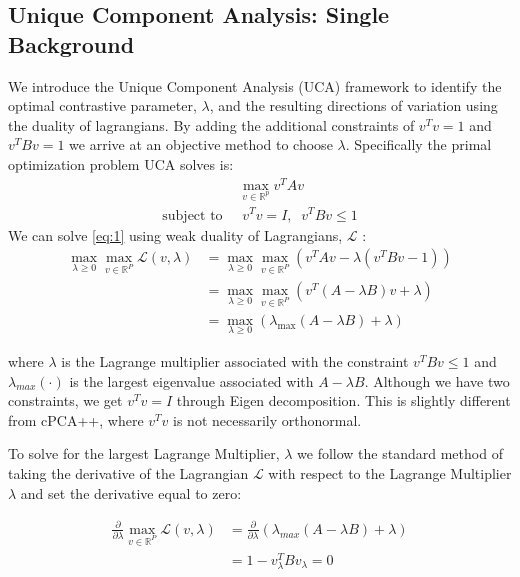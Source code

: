 \documentclass[12pt]{article}
\begin{document}
\subsection{Unique Component Analysis: Single Background}
 We introduce the Unique Component Analysis (UCA) framework to identify the optimal contrastive parameter, $\lambda$, and the resulting directions of variation using the duality of lagrangians.
 By adding the additional constraints of $v^T v = 1$ and $v^T Bv = 1$ we arrive at an objective method to choose $\lambda$. Specifically the primal optimization problem UCA solves is:
     \begin{align}
         &\max_{v\in \mathbb{R}^p}{v^TAv} \label{eq:1} \\ \text{subject to }&\; v^{T}v=I,\;\; v^TBv \leq 1 \nonumber
     \end{align}
    We can solve \ref{eq:1} using weak duality of Lagrangians, $\mathcal{L}$ :
     \begin{align}
         \max_{\lambda \geq 0}{\max_{v\in \mathbb{R}^{P}}{\mathcal{L}}}\left(v,\lambda\right) &= \max_{\lambda \geq 0}{\max_{v\in \mathbb{R}^{P}}{\left( v^TAv - \lambda\left(v^TBv - 1\right)\right)}} \nonumber\\
         &= \max_{\lambda \geq 0}{\max_{v\in \mathbb{R}^{P}}{\left(v^T\left(A - \lambda B\right)v + \lambda\right)}}\nonumber\\
         &= \max_{\lambda \geq 0}{\left(\lambda_{\text{max}}\left(A - \lambda B\right) + \lambda\right)} \label{eq:2}
     \end{align}
     
    where $\lambda$ is the Lagrange multiplier associated with the constraint $v^TBv \leq 1$ and $\lambda_{max}\left(\cdot\right)$ is the largest eigenvalue associated with $A - \lambda B$. Although we have two constraints, we get $v^T v = I$ through Eigen decomposition. This is slightly different from cPCA++, where $v^{T}v$ is not necessarily orthonormal. 
    
    To solve for the largest Lagrange Multiplier, $\lambda$ we follow the standard method of taking the derivative of the Lagrangian $\mathcal{L}$ with respect to the Lagrange Multiplier $\lambda$ and set the derivative equal to zero: 
    
    \begin{align}
   \frac{\partial}{\partial\lambda} \max_{v\in \mathbb{R}^{P}}\mathcal{L}\left(v,\lambda\right) &= \frac{\partial}{\partial\lambda}\left(\lambda_{max}\left(A-\lambda B\right)  + \lambda\right) \nonumber \\ 
   &= 1-v_{\lambda}^{T}B v_{\lambda} = 0 \label{eq:3}
    \end{align}
    
\end{document}
